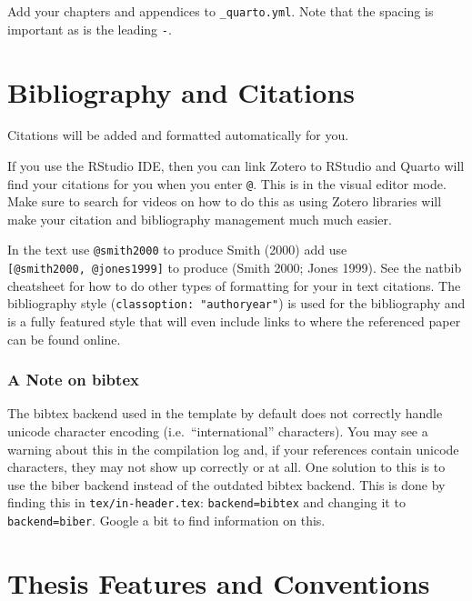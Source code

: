 \documentclass[
  letterpaper,
  11pt,
  spanish,
  singlespacing,
  headsepline]{MastersDoctoralThesis}
\begin{document}
Add your chapters and appendices to \texttt{\_quarto.yml}. Note that the
spacing is important as is the leading \texttt{-}.

\hypertarget{bibliography-and-citations}{%
\section{Bibliography and Citations}\label{bibliography-and-citations}}

Citations will be added and formatted automatically for you.

If you use the RStudio IDE, then you can link Zotero to RStudio and
Quarto will find your citations for you when you enter \texttt{@}. This
is in the visual editor mode. Make sure to search for videos on how to
do this as using Zotero libraries will make your citation and
bibliography management much much easier.

In the text use \texttt{@smith2000} to produce Smith (2000) add use
\texttt{{[}@smith2000,\ @jones1999{]}} to produce (Smith 2000; Jones
1999). See the natbib cheatsheet for how to do other types of formatting
for your in text citations. The bibliography style
(\texttt{classoption:\ "authoryear"}) is used for the bibliography and
is a fully featured style that will even include links to where the
referenced paper can be found online.

\hypertarget{a-note-on-bibtex}{%
\subsubsection{A Note on bibtex}\label{a-note-on-bibtex}}

The bibtex backend used in the template by default does not correctly
handle unicode character encoding (i.e.~``international'' characters).
You may see a warning about this in the compilation log and, if your
references contain unicode characters, they may not show up correctly or
at all. One solution to this is to use the biber backend instead of the
outdated bibtex backend. This is done by finding this in
\texttt{tex/in-header.tex}: \texttt{backend=bibtex} and changing it to
\texttt{backend=biber}. Google a bit to find information on this.

\hypertarget{sec-ThesisConventions}{%
\section{Thesis Features and Conventions}\label{sec-ThesisConventions}}
\end{document}
